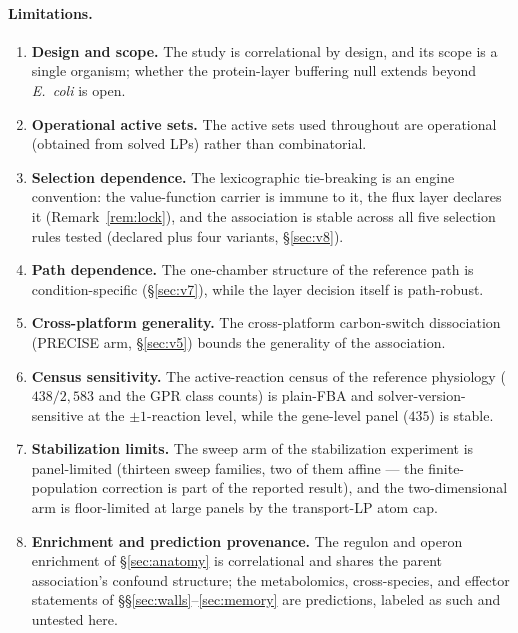 \documentclass[11pt,a4paper]{article}
\theoremstyle{plain}
\theoremstyle{definition}
\theoremstyle{remark}
\begin{document}
\paragraph{Limitations.}
\begin{enumerate}[label=\textbf{\arabic*.},leftmargin=2.2em,itemsep=2pt]
\item \textbf{Design and scope.} The study is correlational by
      design, and its scope is a single organism; whether the
      protein-layer buffering null extends beyond \emph{E.~coli} is
      open.
\item \textbf{Operational active sets.} The active sets used
      throughout are operational (obtained from solved LPs) rather
      than combinatorial.
\item \textbf{Selection dependence.} The lexicographic tie-breaking
      is an engine convention: the value-function carrier is immune
      to it, the flux layer declares it (Remark~\ref{rem:lock}), and
      the association is stable across all five selection rules
      tested (declared plus four variants, \S\ref{sec:v8}).
\item \textbf{Path dependence.} The one-chamber structure of the
      reference path is condition-specific (\S\ref{sec:v7}), while
      the layer decision itself is path-robust.
\item \textbf{Cross-platform generality.} The cross-platform
      carbon-switch dissociation (PRECISE arm, \S\ref{sec:v5})
      bounds the generality of the association.
\item \textbf{Census sensitivity.} The active-reaction census of the
      reference physiology ($438/2{,}583$
      and the GPR class counts) is plain-FBA and solver-version-sensitive
      at the $\pm 1$-reaction level, while the gene-level panel ($435$) is
      stable.
\item \textbf{Stabilization limits.} The sweep arm of the
      stabilization experiment is panel-limited (thirteen sweep
      families, two of them affine --- the finite-population
      correction is part of the reported result), and the
      two-dimensional arm is floor-limited at large panels by the
      transport-LP atom cap.
\item \textbf{Enrichment and prediction provenance.} The regulon and
      operon enrichment of \S\ref{sec:anatomy} is correlational and
      shares the parent association's confound structure; the
      metabolomics, cross-species, and effector statements of
      \S\S\ref{sec:walls}--\ref{sec:memory} are predictions, labeled
      as such and untested here.
\end{enumerate}
\end{document}
